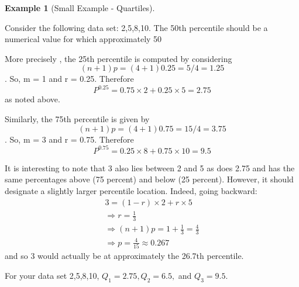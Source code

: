 \documentclass[10pt,]{book}
\theoremstyle{plain}
\theoremstyle{definition}
\theoremstyle{definition}
\newtheorem{example}[theorem]{Example}
\theoremstyle{definition}
\numberwithin{equation}{section}
\begin{document}
\begin{example}[Small Example - Quartiles]\label{example-4}

Consider the following data set: {2,5,8,10}. The 50th percentile should be a numerical value for which approximately 50%
\par
More precisely	, the 25th percentile is computed by considering 
	\begin{equation*}(n+1)p = (4+1)0.25 = 5/4 = 1.25\end{equation*}.  
	So, m = 1 and r = 0.25. Therefore 
	\begin{equation*}P^{0.25} = 0.75 \times 2 + 0.25 \times 5 = 2.75\end{equation*} 
	as noted above. 
\par

	Similarly, the 75th percentile is given by
	\begin{equation*}(n+1)p = (4+1)0.75 = 15/4 = 3.75\end{equation*}.  
	So, m = 3 and r = 0.75. Therefore 
	\begin{equation*}P^{0.75} = 0.25 \times 8 + 0.75 \times 10 = 9.5\end{equation*} 
	
	It is interesting to note that 3 also lies between 2 and 5 as does 2.75 and has the same percentages above (75 percent) and below (25 percent). However, it should designate a slightly larger percentile location. Indeed, going backward:
	\begin{gather*}
3 = (1-r) \times 2 + r \times 5\\
\Rightarrow r = \frac{1}{3}\\
\Rightarrow (n+1)p = 1 + \frac{1}{3} = \frac{4}{3}\\
\Rightarrow p = \frac{4}{15} \approx 0.267
\end{gather*}
	and so 3 would actually be at approximately the 26.7th percentile.
\end{example}
\par

	For your data set {2,5,8,10}, 
	\(Q_1 = 2.75, Q_2 = 6.5,\) and \(Q_3 = 9.5\).
\par
\end{document}
